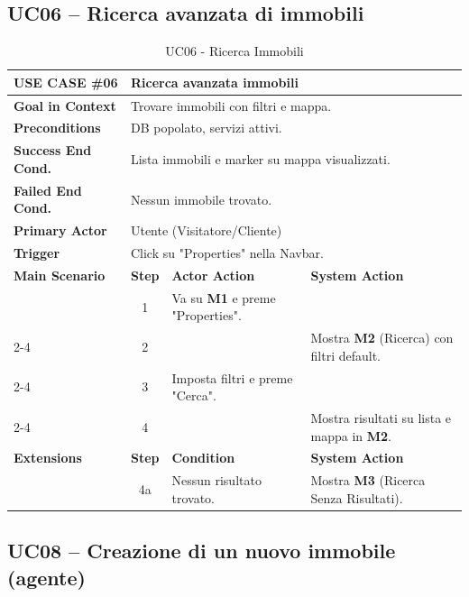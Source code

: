 \documentclass[a4paper,11pt]{report}
\begin{document}
\subsection*{UC06 -- Ricerca avanzata di immobili}

\begin{table}[H]
\centering
\small
\setlength{\tabcolsep}{3pt} %
\renewcommand{\arraystretch}{1.3}
\noindent
\begin{tabularx}{\linewidth}{|p{3cm}|c|X|X|}
\hline
\textbf{USE CASE \#06} & \multicolumn{3}{l|}{\textbf{Ricerca avanzata immobili}} \\ \hline
\textbf{Goal in Context} & \multicolumn{3}{l|}{Trovare immobili con filtri e mappa.} \\ \hline
\textbf{Preconditions} & \multicolumn{3}{l|}{DB popolato, servizi attivi.} \\ \hline
\textbf{Success End Cond.} & \multicolumn{3}{l|}{Lista immobili e marker su mappa visualizzati.} \\ \hline
\textbf{Failed End Cond.} & \multicolumn{3}{l|}{Nessun immobile trovato.} \\ \hline
\textbf{Primary Actor} & \multicolumn{3}{l|}{Utente (Visitatore/Cliente)} \\ \hline
\textbf{Trigger} & \multicolumn{3}{l|}{Click su "Properties" nella Navbar.} \\ \hline
\textbf{Main Scenario} & \textbf{Step} & \textbf{Actor Action} & \textbf{System Action} \\ \hline 
 & 1 & Va su \textbf{M1} e preme "Properties". &  \\ \cline{2-4} 
 & 2 & & Mostra \textbf{M2} (Ricerca) con filtri default. \\ \cline{2-4} 
 & 3 & Imposta filtri e preme "Cerca". &  \\ \cline{2-4} 
 & 4 & & Mostra risultati su lista e mappa in \textbf{M2}. \\ \hline
\textbf{Extensions} & \textbf{Step} & \textbf{Condition} & \textbf{System Action} \\ \hline 
 & 4a & Nessun risultato trovato. & Mostra \textbf{M3} (Ricerca Senza Risultati). \\ \hline
\end{tabularx}
\caption{UC06 - Ricerca Immobili}
\end{table}


\pagebreak

\subsection*{UC08 -- Creazione di un nuovo immobile (agente)}
\end{document}
